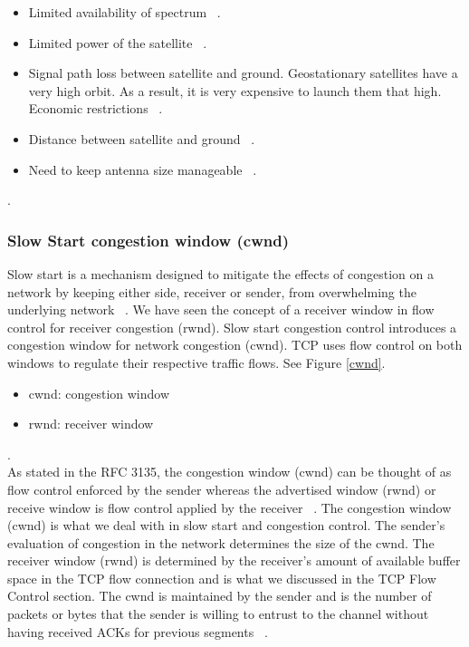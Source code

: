 \begin{itemize}
\item Limited availability of spectrum ~\cite{8}.
\item Limited power of the satellite ~\cite{8}.
\item Signal path loss between satellite and ground. Geostationary satellites have a very high orbit. As a result, it is very expensive to launch them that high. Economic restrictions ~\cite{8}.
\item Distance between satellite and ground ~\cite{8}.
\item Need to keep antenna size manageable ~\cite{8}.
\end{itemize}.
\\

\subsubsection*{Slow Start congestion window (cwnd)}
Slow start is a mechanism designed to mitigate the effects of congestion on a network by keeping either side, receiver or sender, from overwhelming the underlying network ~\cite{17}. We have seen the concept of a receiver window in flow control for receiver congestion (rwnd). Slow start congestion control introduces a congestion window for network congestion (cwnd). TCP uses flow control on both windows to regulate their respective traffic flows. See Figure \ref{cwnd}. \\

\begin{itemize}
\item cwnd: congestion window
\item rwnd: receiver window
\end{itemize}.
\\

As stated in the RFC 3135, the congestion window (cwnd) can be thought of as flow control enforced by the sender whereas the advertised window (rwnd) or receive window is flow control applied by the receiver ~\cite{6}. The congestion window (cwnd) is what we deal with in slow start and congestion control. The sender's evaluation of congestion in the network determines the size of the cwnd. The receiver window (rwnd) is determined by the receiver's amount of available buffer space in the TCP flow connection and is what we discussed in the TCP Flow Control section. The cwnd is maintained by the sender and is the number of packets or bytes that the sender is willing to entrust to the channel without having received ACKs for previous segments ~\cite{17}. \\

